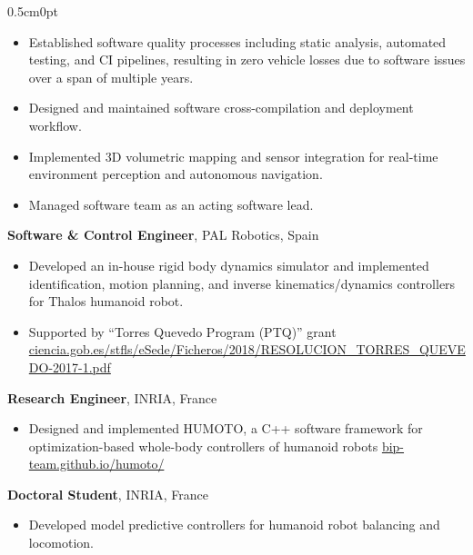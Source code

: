 \documentclass[a4paper,10pt]{report}
\newcommand{\cvurl}[2]{\href{#1://#2}{\url{#2}}}
\newcommand{\cventry}[3]{\textbf{\makebox[2.7cm][l]{#1 -- #2} #3}}
\newenvironment{cvindent}{\begin{adjustwidth}{0.5cm}{0pt}}{\end{adjustwidth}}
\begin{document}
\begin{cvindent}
\begin{itemize}
        \item Established software quality processes including static analysis,
            automated testing, and CI pipelines, resulting in zero vehicle
            losses due to software issues over a span of multiple years.

        \item Designed and maintained software cross-compilation and deployment
            workflow.

        \item Implemented 3D volumetric mapping and sensor integration for
            real-time environment perception and autonomous navigation.

        \item Managed software team as an acting software lead.
    \end{itemize}

    \vspace{0.15cm}

    \cventry{2017}{2019}{Software \& Control Engineer}, PAL Robotics, Spain
    \begin{itemize}
        \item Developed an in-house rigid body dynamics simulator and
            implemented identification, motion planning, and inverse
            kinematics/dynamics controllers for Thalos humanoid robot.

        \item Supported by ``Torres Quevedo Program (PTQ)'' grant \\
            \cvurl{https}{ciencia.gob.es/stfls/eSede/Ficheros/2018/RESOLUCION_TORRES_QUEVEDO-2017-1.pdf}
    \end{itemize}

    \vspace{0.15cm}

    \cventry{2016}{2017}{Research Engineer}, INRIA, France
    \begin{itemize}
        \item Designed and implemented HUMOTO, a C++ software framework for
            optimization-based whole-body controllers of humanoid robots
            \cvurl{https}{bip-team.github.io/humoto/}
    \end{itemize}

    \vspace{0.15cm}

    \cventry{2012}{2016}{Doctoral Student}, INRIA, France
    \begin{itemize}
        \item Developed model predictive controllers for humanoid robot
            balancing and locomotion.


\end{itemize}
\end{cvindent}
\end{document}
